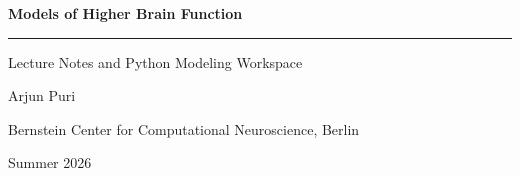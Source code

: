 \begin{titlepage}
  \centering
  \vspace*{3cm}

  {\sffamily\Huge\bfseries Models of Higher Brain Function}

  \vspace{0.6cm}
  {\rule{0.4\textwidth}{0.6pt}}

  \vspace{0.6cm}
  {\sffamily\Large Lecture Notes and Python Modeling Workspace}

  \vspace{2.5cm}
  {\large Arjun Puri}

  \vspace{0.4cm}
  {\normalsize Bernstein Center for Computational Neuroscience, Berlin}

  \vfill

  {\small Summer 2026}

  \vspace{1cm}
\end{titlepage}
